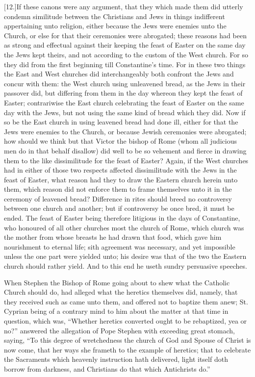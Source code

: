 [12.]If these canons were any argument, that they which made them did utterly condemn similitude between the Christians and Jews in things indifferent appertaining unto religion, either because the Jews were enemies unto the Church, or else for that their ceremonies were abrogated; these reasons had been as strong and effectual against their keeping the feast of Easter on the same day the Jews kept theirs, and not according to the custom of the West church. For so they did from the first beginning till Constantine’s time. For in these two things the East and West churches did interchangeably both confront the Jews and concur with them: the West church using unleavened bread, as the Jews in their passover did, but differing from them in the day whereon they kept the feast of Easter; contrariwise the East church celebrating the feast of Easter on the same day  with the Jews, but not using the same kind of bread which they did. Now if so be the East church in using leavened bread had done ill, either for that the Jews were enemies to the Church, or because Jewish ceremonies were abrogated; how should we think but that Victor the bishop of Rome (whom all judicious men do in that behalf disallow) did well to be so vehement and fierce in drawing them to the like dissimilitude for the feast of Easter? Again, if the West churches had in either of those two respects affected dissimilitude with the Jews in the feast of Easter, what reason had they to draw the Eastern church herein unto them, which reason did not enforce them to frame themselves unto it in the ceremony of leavened bread? Difference in rites should breed no controversy between one church and another; but if controversy be once bred, it must be ended. The feast of Easter being therefore litigious in the days of Constantine, who honoured of all other churches most the church of Rome, which church was the mother from whose breasts he had drawn that food, which gave him nourishment to eternal life; sith agreement was necessary, and yet impossible unless the one part were yielded unto; his desire was that of the two the Eastern church should rather yield. And to this end he useth sundry persuasive speeches.

When Stephen the Bishop of Rome going about to shew what the Catholic Church should do, had alleged what the heretics themselves did, namely, that they received such as came unto them, and offered not to baptize them anew; St. Cyprian being of a contrary mind to him about the matter at that time in question, which was, “Whether heretics converted ought to be rebaptized, yea or no?” answered the allegation of Pope Stephen with exceeding great stomach, saying, “To this degree of wretchedness the church of God and Spouse of Christ is now come, that her ways she frameth to the example of heretics; that to celebrate the Sacraments  which heavenly instruction hath delivered, light itself doth borrow from darkness, and Christians do that which Antichrists do.”

